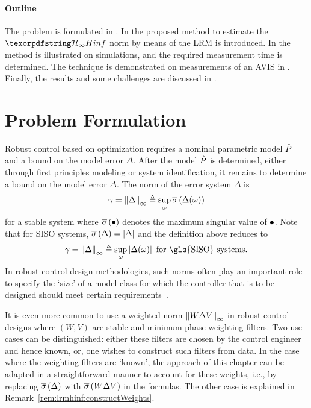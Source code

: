 \paragraph*{Outline}
\label{par:lrmhinf:toc}
The problem is formulated in .
In  the proposed method to estimate the $\Hinf{}$ norm by means of the \gls{LRM} is introduced.
In  the method is illustrated on simulations, and the required measurement time is determined.
The technique is demonstrated on measurements of an \gls{AVIS} in .
Finally, the results and some challenges are discussed in .

\section{Problem Formulation}
\label{sec:lrmhinf:Problem}
Robust control based on \Hinf{} optimization requires a nominal parametric model $\hat{P}$ and a bound on the model error $\Delta$. 
After the model $\hat{P}$ is determined, either through first principles modeling or system identification, it remains to determine a bound on the model error $\Delta$.
The \Hinf{} norm of the error system $\Delta$ is
\begin{equation}
  \gamma 
     = 
       \left\| \Delta \right\|_{\infty} 
    \triangleq 
       \sup_{\omega} 
          \overline{\sigma} \left( \Delta(\omega) \right) 
  \label{eq:lrmhinf:HinfNorm}
\end{equation}
for a stable system where $ \overline{\sigma} \left( \bullet \right) $ denotes the maximum singular value of $\bullet$.
Note that for \gls{SISO} systems, $ \overline{\sigma} \left( \Delta \right)  = \left| \Delta \right|$ and the definition above reduces to
\begin{equation}
  \gamma 
    = 
       \infnorm{\Delta} 
    \isdef 
         \sup_{\omega} 
         \abs{\Delta(\omega)}
  \text{ for \gls{SISO} systems}
  \text{.}
  \label{eq:lrmhinf:HinfNormSISO}
\end{equation}
In robust control design methodologies, such \Hinf{} norms often play an important role to specify the `size' of a model class for which the controller that is to be designed should meet certain requirements~\citep{Skogestad2005}.

\begin{remark}
It is even more common to use a weighted norm $\left\| W \Delta V \right\|_{\infty}$ in robust control designs where $(W,V)$ are stable and minimum-phase weighting filters.
Two use cases can be distinguished: either these filters are chosen by the control engineer and hence known, or, one wishes to construct such filters from data.
In the case where the weighting filters are `known', the approach of this chapter can be adapted in a straightforward manner to account for these weights, i.e., by replacing $ \overline{\sigma} \left( \Delta \right) $ with $ \overline{\sigma} \left( W \Delta V \right) $ in the formulas.
The other case is explained in Remark~\ref{rem:lrmhinf:constructWeights}.
\end{remark}

